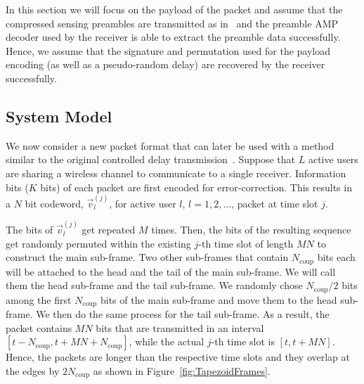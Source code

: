 \documentclass[journal,onecolumn,12pt]{IEEEtran}
\begin{document}
In this section we will focus on the payload of the packet and assume that the compressed sensing preambles are transmitted as in~\cite{TBKN20} and the preamble AMP decoder used by the receiver is able to extract the preamble data successfully. Hence, we assume that the signature and permutation used for the payload encoding (as well as a pseudo-random delay) are recovered by the receiver successfully.


\subsection{System Model}
\label{sec:scenario}
We now consider a new packet format that can later be used with a method similar to the original controlled delay transmission~\cite{TBKN20}. Suppose that $L$ active users are sharing a wireless channel to communicate to a single receiver. Information bits ($K$ bits) of each packet are first encoded for error-correction. This results in a $N$ bit codeword, $\vec{v}_l^{(j)}$, for active user $l$, $l=1,2,\dots$, packet at time slot $j$.

The bits of $\vec{v}_l^{(j)}$ get repeated $M$ times. Then, the bits of the resulting sequence get randomly permuted within the existing $j$-th time slot of length $MN$ to construct the main sub-frame. Two other sub-frames that contain $N_{\text{coup}}$ bits each will be attached to the head and the tail of the main sub-frame. We will call them the head sub-frame and the tail sub-frame. We randomly chose $N_{\text{coup}}/2$ bits among the first $N_{\text{coup}}$ bits of the main sub-frame and move them to the head sub-frame. We then do the same process for the tail sub-frame.
As a result, the packet contains $MN$ bits that are transmitted in an interval $[t-N_{\text{coup}},t+MN+  N_{\text{coup}}]$, while the actual $j$-th time slot is $[t,t+MN]$. Hence, the packets are longer than the respective time slots and they overlap at the edges by $2N_{\text{coup}}$ as shown in Figure~\ref{fig:TapezoidFrames}.
\end{document}

